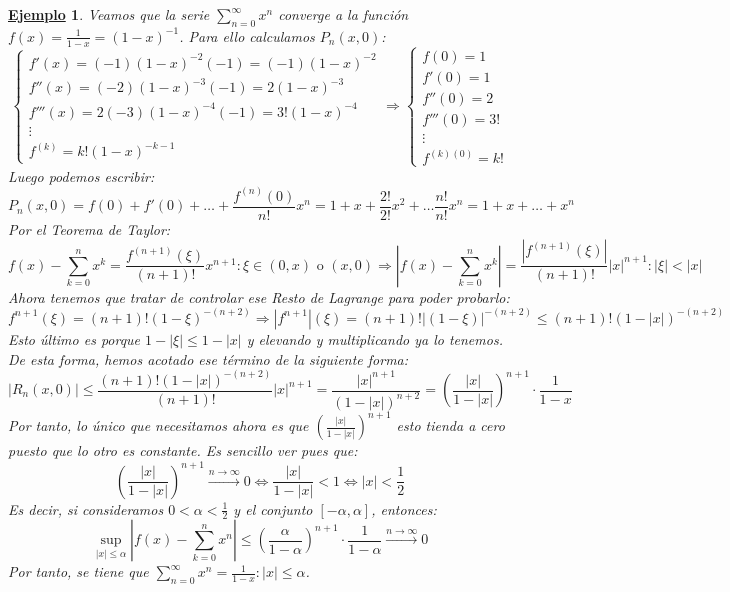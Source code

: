 \documentclass[10pt,a4paper,openright]{book}
\theoremstyle{break}
\newtheorem{ej}{\underline{Ejemplo}}[chapter]
\begin{document}
\begin{ej}
Veamos que la serie $\sum_{n = 0}^{\infty} x^n$ converge a la función $f(x) = \frac{1}{1-x} = (1-x)^{-1}$. Para ello calculamos $P_n(x,0)$:
$$\begin{cases} f'(x) = (-1) (1-x)^{-2} (-1) = (-1) (1-x)^{-2} \\
f''(x) = (-2) (1-x)^{-3} (-1) = 2 (1-x)^{-3} \\
f'''(x) = 2 (-3) (1-x)^{-4} (-1) = 3! (1-x)^{-4} \\
\vdots \\
f^{(k)} = k! (1-x)^{-k - 1}
\end{cases} \Rightarrow \begin{cases} f(0) = 1 \\ f'(0) = 1 \\ f''(0) = 2 \\ f'''(0) = 3! \\ \vdots \\ f^{(k)(0)} = k! \end{cases}$$
Luego podemos escribir:
$$P_n (x, 0) = f(0) + f'(0) + \ldots + \frac{f^{(n)} (0)}{n!} x^n = 1+  x + \frac{2!}{2!} x^2 + \ldots \frac{n!}{n!} x^n = 1+ x + \ldots + x^n$$
Por el Teorema de Taylor:
$$f(x) - \sum_{k=0}^{n} x^k = \frac{f^{(n+1)}(\xi)}{(n+1)!} x^{n+1} : \xi \in (0,x) \mbox{ o } (x, 0) \Rightarrow \left| f(x) - \sum_{k=0}^{n} x^k \right|= \frac{|f^{(n+1)} (\xi)|}{(n+1)!} |x|^{n+1} : |\xi| < |x|$$
Ahora tenemos que tratar de controlar ese Resto de Lagrange para poder probarlo:
$$f^{n+1} (\xi) = (n+1)! (1-\xi)^{- (n+2)} \Rightarrow |f^{n+1}| (\xi) = (n+1)! |(1-\xi)|^{- (n+2)} \leq (n+1)! (1 - |x|)^{- (n+2)} $$
Esto último es porque $1-|\xi| \leq 1 - |x|$ y elevando y multiplicando ya lo tenemos. De esta forma, hemos acotado ese término de la siguiente forma:
$$|R_n (x,0) | \leq \frac{(n+1) ! (1 - |x|)^{- (n+2)} }{(n+1)!} |x|^{n+1} = \frac{|x|^{n+1}}{(1 - |x|)^ {n+2}} = \left(\frac{|x|}{1-|x|}\right)^{n+1} \cdot \frac{1}{1-x}$$
Por tanto, lo único que necesitamos ahora es que $\left(\frac{|x|}{1-|x|}\right)^{n+1}$ esto tienda a cero puesto que lo otro es constante. Es sencillo ver pues que:
$$\left(\frac{|x|}{1-|x|}\right)^{n+1} \xrightarrow{n\rightarrow\infty} 0\Leftrightarrow \frac{|x|}{1-|x|} < 1 \Leftrightarrow |x| < \frac{1}{2}$$
Es decir, si consideramos  $0 < \alpha < \frac{1}{2}$ y el conjunto $[-\alpha, \alpha]$, entonces:
$$\underset{|x| \leq \alpha} {\sup} \left|f(x) - \sum_{k=0}^{n} x^n\right| \leq \left(\frac{\alpha}{1 - \alpha}\right)^{n+1} \cdot \frac{1}{1-\alpha} \xrightarrow{n\rightarrow\infty} 0$$
Por tanto, se tiene que $\sum_{n=0}^{\infty} x^n = \frac{1}{1-x} : |x| \leq \alpha$.
\end{ej}
\end{document}
